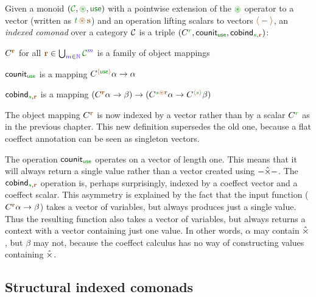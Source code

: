 \begin{definition}
Given a monoid $(\C, \cseq, \cunit)$ with a pointwise extension of the $\cseq$ operator to a vector
(written as $\cclrd{t}\,\aseq\,\aclrd{\textbf{s}}$) and an operation lifting scalars to vectors
$\alift{-}$, an \emph{indexed comonad} over a category $\mathcal{C}$ is a triple
$(\ctyp{\cclrd{r}{}}, \ident{counit}_{\cunit}, \ident{cobind}_{\cclrd{s}, \aclrd{\textbf{r}}})$:

\begin{compactitem}
\item $\ctyp{\aclrd{\textbf{r}}}{}$ for all $\aclrd{\textbf{r}} \in \bigcup_{\sclrd{m}\in \sclrd{\mathbb{N}}} \C^{\sclrd{m}}$ is a family of object mappings
\item $\ident{counit}_{\cunit}$ is a mapping $\ctyp{\alift{\cunit}}{\alpha} \rightarrow \alpha$
\item $\ident{cobind}_{\cclrd{s}, \aclrd{\textbf{r}}}$ is a mapping $(\ctyp{\aclrd{\textbf{r}}}{\alpha} \rightarrow \beta)
  \rightarrow (\ctyp{\cclrd{s}\aseq\aclrd{\textbf{r}}}{\alpha} \rightarrow \ctyp{\alift{\cclrd{s}}}{\beta})$
\end{compactitem}
\end{definition}

\noindent
The object mapping $\ctyp{\aclrd{\textbf{r}}}$ is now indexed by a vector rather than by a scalar
$\ctyp{\cclrd{r}}$ as in the previous chapter. This new definition supersedes the old one, because a
flat coeffect annotation can be seen as singleton vectors.

The operation $\ident{counit}_{\cunit}$ operates on a vector of length one. This means that it will always
return a single value rather than a vector created using $-\hat{\times}-$. The $\ident{cobind}_{\cclrd{s}, \aclrd{\textbf{r}}}$
operation is, perhaps surprisingly, indexed by a coeffect vector and a coeffect scalar. This asymmetry
is explained by the fact that the input function ($\ctyp{\aclrd{\textbf{r}}}{\alpha} \rightarrow \beta$)
takes a vector of variables, but always produces just a single value. Thus the resulting function
also takes a vector of variables, but always returns a context with a vector containing just one value.
In other words, $\alpha$ may contain $\hat{\times}$, but $\beta$ may not, because the coeffect calculus has
no way of constructing values containing $\hat{\times}$.


\subsection{Structural indexed comonads}
\label{sec:struct-semantics-idxc}

